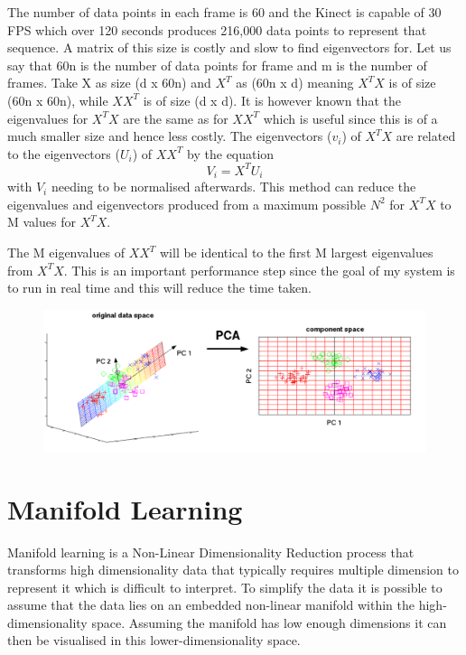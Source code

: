 The number of data points in each frame is 60 and the Kinect is capable of 30 FPS which over 120 seconds produces 216,000 data points to represent that sequence. A matrix of this size is costly and slow to find eigenvectors for. Let us say that 60n is the number of data points for frame and m is the number of frames. Take X as size (d x 60n) and $X^T$ as (60n x d) meaning $X^TX$ is of size (60n x 60n), while $XX^T$ is of size (d x d). It is however known that the eigenvalues for $X^TX$ are the same as for $XX^T$ which is useful since this is of a much smaller size and hence less costly.\cite{fastPCA}
The eigenvectors ($v_i$) of $X^TX$ are related to the eigenvectors ($U_i$) of $XX^T$ by the equation $$V_i = X^TU_i$$ with $V_i$ needing to be normalised afterwards. This method can reduce the eigenvalues and eigenvectors produced from a maximum possible $N^2$ for $X^TX$ to M values for $X^TX$.

The M eigenvalues of $XX^T$ will be identical to the first M largest eigenvalues from $X^TX$. This is an important performance step since the goal of my system is to run in real time and this will reduce the time taken.

\begin{figure}[h]
    \centering
    \includegraphics[height=0.25\textheight]{fig02/PCA.pdf}
\end{figure}


\section{Manifold Learning}
Manifold learning is a Non-Linear Dimensionality Reduction process that transforms high dimensionality data that typically requires multiple dimension to represent it which is difficult to interpret. To simplify the data it is possible to assume that the data lies on an embedded non-linear manifold within the high-dimensionality space. Assuming the manifold has low enough dimensions it can then be visualised in this lower-dimensionality space.


